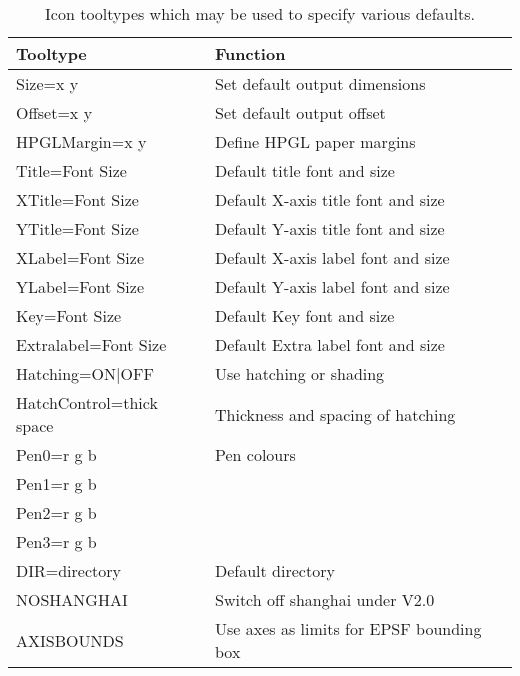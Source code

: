 \begin{table}
\begin{center}
\small
\begin{tabular}{ll} \hline
Tooltype                      &   Function                           \\ \hline
Size=x y                      &   Set default output dimensions      \\
Offset=x y                    &   Set default output offset          \\
HPGLMargin=x y                &   Define HPGL paper margins          \\
Title=Font Size               &   Default title font and size        \\
XTitle=Font Size              &   Default X-axis title font and size \\ 
YTitle=Font Size              &   Default Y-axis title font and size \\
XLabel=Font Size              &   Default X-axis label font and size \\
YLabel=Font Size              &   Default Y-axis label font and size \\
Key=Font Size                 &   Default Key font and size          \\
Extralabel=Font Size          &   Default Extra label font and size  \\
Hatching=ON$\mid$OFF          &   Use hatching or shading            \\
HatchControl=thick space      &   Thickness and spacing of hatching  \\
Pen0=r g b                    &   Pen colours                        \\
Pen1=r g b                    &                                      \\
Pen2=r g b                    &                                      \\
Pen3=r g b                    &                                      \\
DIR=directory                 &   Default directory                  \\
NOSHANGHAI                    &   Switch off shanghai under V2.0     \\
AXISBOUNDS                    &   Use axes as limits for EPSF bounding box \\ \hline
\end{tabular}
\end{center}
\caption[Icon tooltypes]{\label{tab:tooltypes} Icon tooltypes which may be used
to specify various defaults.}
\end{table}

